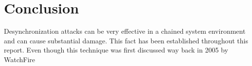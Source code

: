 \chapter{Conclusion}
Desynchronization attacks can be very effective in a chained system environment and can cause substantial damage. This fact has been established throughout this report. Even though this technique was first discussed way back in 2005 by WatchFire \cite{b5}